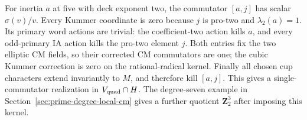 For inertia \(a\) at five with deck exponent two, the commutator
\([a,j]\) has scalar \(\sigma(v)/v\). Every Kummer coordinate is
zero because \(j\) is pro-two and \(\lambda_2(a)=1\).
Its primary word actions are trivial: the coefficient-two action kills
\(a\), and every odd-primary IA action kills the pro-two element
\(j\). Both entries fix the two elliptic CM fields, so their corrected
CM commutators are one; the cubic Kummer correction is zero on the
rational-radical kernel. Finally all chosen cup characters extend
invariantly to \(M\), and therefore kill \([a,j]\). This gives a
single-commutator realization in \(V_{\rm quad}\cap H\).
The degree-seven example in Section~\ref{sec:prime-degree-local-cm}
gives a further quotient \(\mathbf Z_2^3\) after imposing this kernel.
